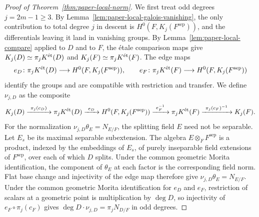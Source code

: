 \begin{proof}[Proof of Theorem~\ref{thm:paper-local-norm}]
We first treat odd degrees $j=2m-1\ge3$.
By Lemma~\ref{lem:paper-local-galois-vanishing}, the only contribution to total degree $j$ in descent is $H^0(F,K_j(F^{\mathrm{sep}}))$, and the differentials leaving it land in vanishing groups.
By Lemma~\ref{lem:paper-local-compare} applied to $D$ and to $F$, the \'etale comparison maps give $K_j(D)\simeq\pi_jK^{\mathrm{\acute et}}(D)$ and $K_j(F)\simeq\pi_jK^{\mathrm{\acute et}}(F)$.
The edge maps
\[
 e_D\colon\pi_jK^{\mathrm{\acute et}}(D)\longrightarrow H^0(F,K_j(F^{\mathrm{sep}})),\qquad
 e_F\colon\pi_jK^{\mathrm{\acute et}}(F)\longrightarrow H^0(F,K_j(F^{\mathrm{sep}}))
\]
identify the groups and are compatible with restriction and transfer.
We define $\nu_{j,D}$ as the composite
\[
 K_j(D)\xrightarrow{\ \pi_j(c_D)\ }\pi_jK^{\et}(D)\xrightarrow{\ e_D\ }H^0(F,K_j(F^{\mathrm{sep}}))\xrightarrow{\ e_F^{-1}\ }\pi_jK^{\et}(F)\xrightarrow{\ \pi_j(c_F)^{-1}\ }K_j(F).
\]
For the normalization $\nu_{j,D}\theta_E=N_{E/F}$, the splitting field $E$ need not be separable.
Let $E_s$ be its maximal separable subextension.
The algebra $E\otimes_FF^{\mathrm{sep}}$ is a product, indexed by the embeddings of $E_s$, of purely inseparable field extensions of $F^{\mathrm{sep}}$, over each of which $D$ splits.
Under the common geometric Morita identification, the component of $\theta_E$ at each factor is the corresponding field norm.
Flat base change and injectivity of the edge map therefore give $\nu_{j,D}\theta_E=N_{E/F}$.
Under the common geometric Morita identification for $e_D$ and $e_F$, restriction of scalars at a geometric point is multiplication by $\deg D$, so injectivity of $e_F\circ\pi_j(c_F)$ gives $\deg D\cdot\nu_{j,D}=\pi_jN_{D/F}$ in odd degrees.


\end{proof}

